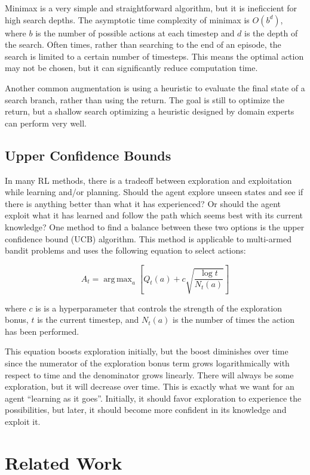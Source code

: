 \documentclass[letterpaper]{article} %
\DeclareMathOperator*{\argmax}{arg\,max}
\begin{document}
Minimax is a very simple and straightforward algorithm, but it is ineficcient for high search depths. The asymptotic time complexity of minimax is \(O(b^{d})\), where \(b\) is the number of possible actions at each timestep and \(d\) is the depth
of the search. Often times, rather than searching to the end of an episode, the search is limited to a certain number of timesteps. This means the optimal action may not be chosen, but it can significantly reduce computation time.

Another common augmentation is using a heuristic to evaluate the final state of a search branch, rather than using the return. The goal is still to optimize the return, but a shallow search optimizing a heuristic designed by domain experts can perform
very well.

\subsection{Upper Confidence Bounds}

In many RL methods, there is a tradeoff between exploration and exploitation while learning and/or planning. Should the agent explore unseen states and see if there is anything better than what it has experienced? Or should the agent exploit what it has
learned and follow the path which seems best with its current knowledge? One method to find a balance between these two options is the upper confidence bound (UCB) algorithm. This method is applicable to multi-armed bandit problems and uses the following
equation to select actions:

\[A_{t} = \argmax_{a}\left[Q_{t}(a) + c \sqrt{\frac{\log t}{N_{t}(a)}}\right]\]

\noindent{}
where \(c\) is is a hyperparameter that controls the strength of the exploration bonus, \(t\) is the current timestep, and \(N_{t}(a)\) is the number of times the action has been performed.

This equation boosts exploration initially, but the boost diminishes over time since the numerator of the exploration bonus term grows logarithmically with respect to time and the denominator grows linearly. There will always be some exploration, but it will
decrease over time. This is exactly what we want for an agent ``learning as it goes''. Initially, it should favor exploration to experience the possibilities, but later, it should become more confident in its knowledge and exploit it.

\section{Related Work}
\end{document}
